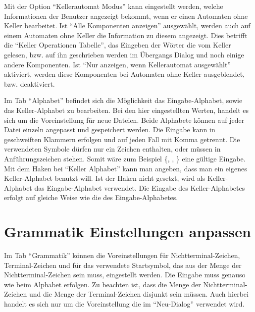 Mit der Option "`Kellerautomat Modus"' kann eingestellt werden, welche Informationen
der Benutzer angezeigt bekommt, wenn er einen Automaten ohne Keller bearbeitet. Ist
"`Alle Komponenten anzeigen"' ausgewählt, werden auch auf einem Automaten ohne Keller
die Information zu diesem angezeigt. Dies betrifft die "`Keller Operationen Tabelle"',
das Eingeben der Wörter die vom Keller gelesen, bzw. auf ihn geschrieben werden im
Übergangs Dialog und noch einige andere Komponenten. Ist "`Nur anzeigen, wenn
Kellerautomat ausgewählt"' aktiviert, werden diese Komponenten bei Automaten ohne
Keller ausgeblendet, bzw. deaktiviert.\vspace{10pt}

Im Tab "`Alphabet"' befindet sich die Möglichkeit das Eingabe-Alphabet, sowie das
Keller-Alphabet zu bearbeiten. Bei den hier eingestellten Werten, handelt es sich
um die Voreinstellung für neue Dateien. Beide Alphabete können auf jeder Datei
einzeln angepasst und gespeichert werden. Die Eingabe kann in geschweiften Klammern
erfolgen und auf jeden Fall mit Komma getrennt. Die verwendeten Symbole dürfen nur
ein Zeichen enthalten, oder müssen in Anführungszeichen stehen. Somit wäre zum
Beispiel \{, ,  \} eine gültige Eingabe. Mit
dem Haken bei "`Keller Alphabet"' kann man angeben, dass man ein eigenes Keller-Alphabet
benutzt will. Ist der Haken nicht gesetzt, wird als Keller-Alphabet das
Eingabe-Alphabet verwendet. Die Eingabe des Keller-Alphabetes erfolgt auf
gleiche Weise wie die des Eingabe-Alphabetes.


\section{Grammatik Einstellungen anpassen}

Im Tab "`Grammatik"' können die Voreinstellungen für Nichtterminal-Zeichen,
Terminal-Zeichen und für das verwendete Startsymbol, das aus der Menge der
Nichtterminal-Zeichen sein muss, eingestellt werden. Die Eingabe muss genauso
wie beim Alphabet erfolgen. Zu beachten ist, dass die Menge der Nichtterminal-
Zeichen und die Menge der Terminal-Zeichen disjunkt sein müssen. Auch hierbei
handelt es sich nur um die Voreinstellung die im "`Neu-Dialog"' verwendet wird.
